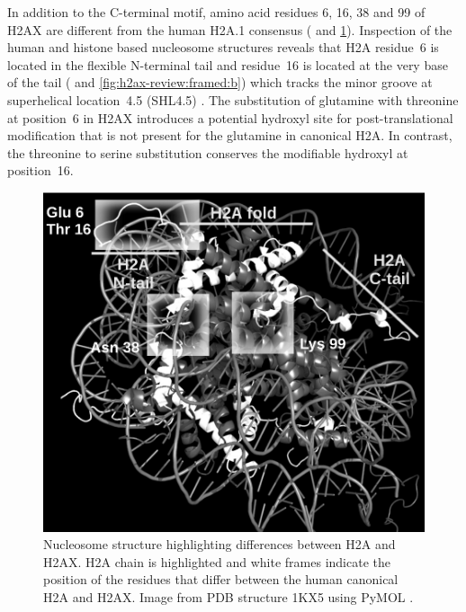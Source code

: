 In addition to the C-terminal motif, amino acid residues 6, 16, 38
and 99 of H2AX are different from the human H2A.1 consensus
( and
\ref{fig:h2ax-review:H2AInNucleosome}). Inspection of the human and
 histone based nucleosome structures reveals that
H2A residue~6 is located in the flexible N-terminal tail and
residue~16 is located at the very base of the tail
( and
\ref{fig:h2ax-review:framed:b}) which tracks the minor groove at
superhelical location~4.5 (SHL4.5)
. The substitution of glutamine with
threonine at position~6 in H2AX introduces a potential hydroxyl site
for post-translational modification that is not present for the
glutamine in canonical H2A. In contrast, the threonine to serine
substitution conserves the modifiable hydroxyl at position~16.

\begin{figure}
\includegraphics{h2ax-review/figs/Fig4}
\caption[Nucleosome structure highlighting differences between H2A and H2AX]%
        {Nucleosome structure highlighting differences between H2A and
          H2AX\@. H2A chain is highlighted and white frames indicate
          the position of the residues that differ between the human
          canonical H2A and H2AX\@. Image from PDB structure 1KX5
          using PyMOL \citep{DeL02}.}
\label{fig:h2ax-review:H2AInNucleosome}
\end{figure}

